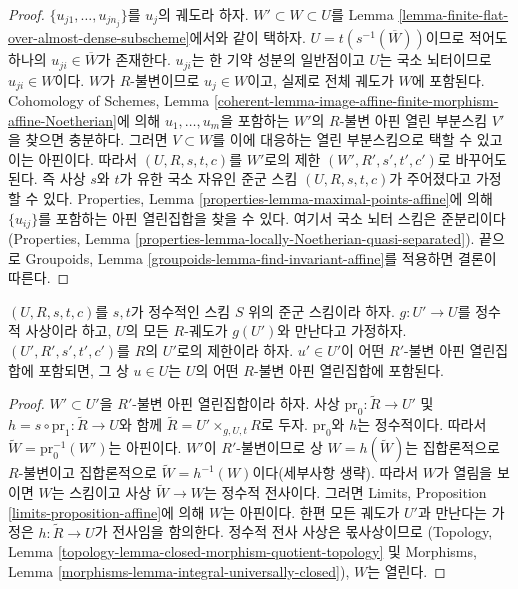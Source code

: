 \begin{proof}
$\{u_{j1}, \ldots, u_{jn_j}\}$를 $u_j$의 궤도라 하자.
$W' \subset W \subset U$를 Lemma
\ref{lemma-finite-flat-over-almost-dense-subscheme}에서와 같이 택하자.
$U = t(s^{-1}(\overline{W}))$이므로 적어도 하나의
$u_{ji} \in \overline{W}$가 존재한다. $u_{ji}$는 한 기약 성분의 일반점이고
$U$는 국소 뇌터이므로 $u_{ji} \in W$이다. $W$가 $R$-불변이므로
$u_j \in W$이고, 실제로 전체 궤도가 $W$에 포함된다. Cohomology of Schemes,
Lemma \ref{coherent-lemma-image-affine-finite-morphism-affine-Noetherian}에 의해
$u_1, \ldots, u_m$을 포함하는 $W'$의 $R$-불변 아핀 열린 부분스킴
$V'$을 찾으면 충분하다. 그러면 $V \subset W$를 이에 대응하는 열린
부분스킴으로 택할 수 있고 이는 아핀이다. 따라서 $(U, R, s, t, c)$를
$W'$로의 제한 $(W', R', s', t', c')$로 바꾸어도 된다. 즉 사상 $s$와
$t$가 유한 국소 자유인 준군 스킴 $(U, R, s, t, c)$가 주어졌다고 가정할
수 있다. Properties, Lemma \ref{properties-lemma-maximal-points-affine}에 의해
$\{u_{ij}\}$를 포함하는 아핀 열린집합을 찾을 수 있다. 여기서 국소 뇌터
스킴은 준분리이다(Properties, Lemma
\ref{properties-lemma-locally-Noetherian-quasi-separated}). 끝으로 Groupoids,
Lemma \ref{groupoids-lemma-find-invariant-affine}를 적용하면 결론이 따른다.
\end{proof}

\begin{lemma}
\label{lemma-find-affine-integral}
$(U, R, s, t, c)$를 $s, t$가 정수적인 스킴 $S$ 위의 준군 스킴이라 하자.
$g : U' \to U$를 정수적 사상이라 하고, $U$의 모든 $R$-궤도가 $g(U')$와
만난다고 가정하자. $(U', R', s', t', c')$를 $R$의 $U'$로의 제한이라 하자.
$u' \in U'$이 어떤 $R'$-불변 아핀 열린집합에 포함되면, 그 상
$u \in U$는 $U$의 어떤 $R$-불변 아핀 열린집합에 포함된다.
\end{lemma}

\begin{proof}
$W' \subset U'$을 $R'$-불변 아핀 열린집합이라 하자. 사상
$\text{pr}_0 : \tilde R \to U'$ 및 $h = s \circ \text{pr}_1 : \tilde R \to U$와
함께 $\tilde R = U' \times_{g, U, t} R$로 두자. $\text{pr}_0$와 $h$는
정수적이다. 따라서 $\tilde W = \text{pr}_0^{-1}(W')$는 아핀이다.
$W'$이 $R'$-불변이므로 상 $W = h(\tilde W)$는 집합론적으로 $R$-불변이고
집합론적으로 $\tilde W = h^{-1}(W)$이다(세부사항 생략). 따라서 $W$가
열림을 보이면 $W$는 스킴이고 사상 $\tilde W \to W$는 정수적 전사이다.
그러면 Limits, Proposition \ref{limits-proposition-affine}에 의해 $W$는
아핀이다. 한편 모든 궤도가 $U'$과 만난다는 가정은
$h : \tilde R \to U$가 전사임을 함의한다. 정수적 전사 사상은 몫사상이므로
(Topology, Lemma \ref{topology-lemma-closed-morphism-quotient-topology} 및
Morphisms, Lemma \ref{morphisms-lemma-integral-universally-closed}), $W$는 열린다.
\end{proof}

